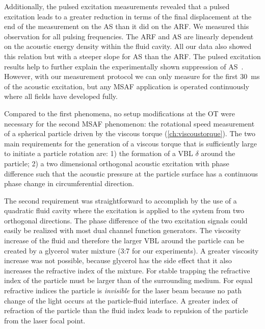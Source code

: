 
Additionally, the pulsed excitation measurements revealed that a pulsed 
excitation leads to a greater reduction in terms of the final displacement at 
the end of the measurement on the AS than it did on the ARF. We measured this 
observation for all pulsing frequencies. The ARF and AS are linearly dependent 
on the acoustic energy density within the fluid cavity. All our data also 
showed this relation but with a steeper slope for AS than the ARF. The pulsed 
excitation results help to further explain the experimentally shown suppression 
of AS~\cite{Hoyos2013,Castro2016}. However, with our measurement protocol we 
can only measure for the first \SI{30}{\ms} of the acoustic excitation, but any 
MSAF application is operated continuously where all fields have developed 
fully.


Compared to the first phenomena, no setup modifications at the OT were 
necessary for the second MSAF phenomenon: the rotational speed measurement of a 
spherical particle driven by the viscous torque (\cref{ch:viscoustorque}). The 
two main requirements for the generation of a viscous torque that is 
sufficiently large to initiate a particle rotation are: 1) the formation of a 
VBL $\delta$ around the particle; 2) a two dimensional orthogonal acoustic 
excitation with phase difference such that the acoustic pressure at the 
particle surface has a continuous phase change in circumferential direction.

The second requirement was straightforward to accomplish by the use of a 
quadratic fluid cavity where the excitation is applied to the system from two 
orthogonal directions. The phase difference of the two excitation signals could 
easily be realized with most dual channel function generators. The viscosity 
increase of the fluid and therefore the larger VBL around the particle can be 
created by a glycerol water mixture (3:7 for our experiments). A greater 
viscosity increase was not possible, because glycerol has the side effect that 
it also increases the refractive index of the mixture. For stable trapping the 
refractive index of the particle must be larger than of the surrounding medium. 
For equal refractive indices the particle is \emph{invisible} for the laser 
beam because no path change of the light occurs at the particle-fluid 
interface. A greater index of refraction of the particle than the fluid index 
leads to repulsion of the particle from the laser focal point.

